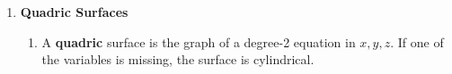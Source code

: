 \documentclass[10pt]{article}
\begin{document}
\begin{multicols}{2}
\begin{enumerate}
\item \textbf{Quadric Surfaces}
\begin{enumerate}
    \item A \textbf{quadric} surface is the graph of a degree-2 equation in $x,y,z$. If one of the variables is missing, the surface is cylindrical.
    

\end{enumerate}
\end{enumerate}
\end{multicols}
\end{document}
